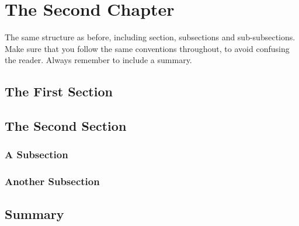 
\chapter{The Second Chapter}
\label{chap:second}


The same structure as before, including section, subsections and sub-subsections. Make sure that you follow the same conventions throughout, to avoid confusing the reader. Always remember to include a summary.


\section{The First Section}
\label{sec:second:first_sec}


\section{The Second Section}
\label{sec:second:second_sec}


\subsection{A Subsection}
\label{sec:second:second_sec:one}


\subsection{Another Subsection}
\label{sec:second:second_sec:two}


\section{Summary}
\label{sec:second:summary}


